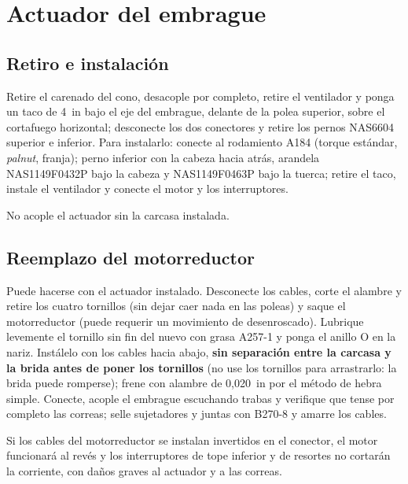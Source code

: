 \section{Actuador del embrague}

\subsection{Retiro e instalación}

Retire el carenado del cono, desacople por completo, retire el ventilador y ponga un taco de 4~in bajo el eje del embrague, delante de la polea superior, sobre el cortafuego horizontal; desconecte los dos conectores y retire los pernos NAS6604 superior e inferior. Para instalarlo: conecte al rodamiento A184 (torque estándar, \emph{palnut}, franja); perno inferior con la cabeza hacia atrás, arandela NAS1149F0432P bajo la cabeza y NAS1149F0463P bajo la tuerca; retire el taco, instale el ventilador y conecte el motor y los interruptores.

\begin{precaucion}
No acople el actuador sin la carcasa instalada.
\end{precaucion}

\subsection{Reemplazo del motorreductor}

Puede hacerse con el actuador instalado. Desconecte los cables, corte el alambre y retire los cuatro tornillos (sin dejar caer nada en las poleas) y saque el motorreductor (puede requerir un movimiento de desenroscado). Lubrique levemente el tornillo sin fin del nuevo con grasa A257-1 y ponga el anillo O en la nariz. Instálelo con los cables hacia abajo, \textbf{sin separación entre la carcasa y la brida antes de poner los tornillos} (no use los tornillos para arrastrarlo: la brida puede romperse); frene con alambre de 0,020~in por el método de hebra simple. Conecte, acople el embrague escuchando trabas y verifique que tense por completo las correas; selle sujetadores y juntas con B270-8 y amarre los cables.

\begin{precaucion}
Si los cables del motorreductor se instalan invertidos en el conector, el motor funcionará al revés y los interruptores de tope inferior y de resortes no cortarán la corriente, con daños graves al actuador y a las correas.
\end{precaucion}

